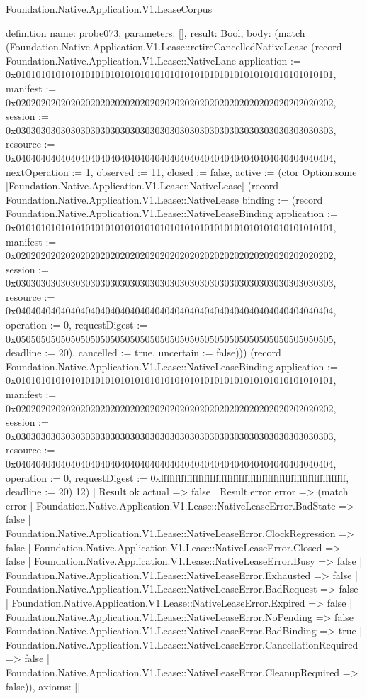 \begin{lexlean}{Foundation.Native.Application.V1.LeaseCorpus}
\begin{semanticmodule}
definition{
  name: probe073,
  parameters: [],
  result: Bool,
  body: (match (Foundation.Native.Application.V1.Lease::retireCancelledNativeLease (record Foundation.Native.Application.V1.Lease::NativeLane {application := 0x0101010101010101010101010101010101010101010101010101010101010101, manifest := 0x0202020202020202020202020202020202020202020202020202020202020202, session := 0x0303030303030303030303030303030303030303030303030303030303030303, resource := 0x0404040404040404040404040404040404040404040404040404040404040404, nextOperation := 1, observed := 11, closed := false, active := (ctor Option.some [Foundation.Native.Application.V1.Lease::NativeLease] (record Foundation.Native.Application.V1.Lease::NativeLease {binding := (record Foundation.Native.Application.V1.Lease::NativeLeaseBinding {application := 0x0101010101010101010101010101010101010101010101010101010101010101, manifest := 0x0202020202020202020202020202020202020202020202020202020202020202, session := 0x0303030303030303030303030303030303030303030303030303030303030303, resource := 0x0404040404040404040404040404040404040404040404040404040404040404, operation := 0, requestDigest := 0x0505050505050505050505050505050505050505050505050505050505050505, deadline := 20}), cancelled := true, uncertain := false}))}) (record Foundation.Native.Application.V1.Lease::NativeLeaseBinding {application := 0x0101010101010101010101010101010101010101010101010101010101010101, manifest := 0x0202020202020202020202020202020202020202020202020202020202020202, session := 0x0303030303030303030303030303030303030303030303030303030303030303, resource := 0x0404040404040404040404040404040404040404040404040404040404040404, operation := 0, requestDigest := 0xffffffffffffffffffffffffffffffffffffffffffffffffffffffffffffffff, deadline := 20}) 12)
    | Result.ok actual => false
    | Result.error error => (match error
      | Foundation.Native.Application.V1.Lease::NativeLeaseError.BadState => false
      | Foundation.Native.Application.V1.Lease::NativeLeaseError.ClockRegression => false
      | Foundation.Native.Application.V1.Lease::NativeLeaseError.Closed => false
      | Foundation.Native.Application.V1.Lease::NativeLeaseError.Busy => false
      | Foundation.Native.Application.V1.Lease::NativeLeaseError.Exhausted => false
      | Foundation.Native.Application.V1.Lease::NativeLeaseError.BadRequest => false
      | Foundation.Native.Application.V1.Lease::NativeLeaseError.Expired => false
      | Foundation.Native.Application.V1.Lease::NativeLeaseError.NoPending => false
      | Foundation.Native.Application.V1.Lease::NativeLeaseError.BadBinding => true
      | Foundation.Native.Application.V1.Lease::NativeLeaseError.CancellationRequired => false
      | Foundation.Native.Application.V1.Lease::NativeLeaseError.CleanupRequired => false)),
  axioms: []
}


\end{semanticmodule}
\end{lexlean}
